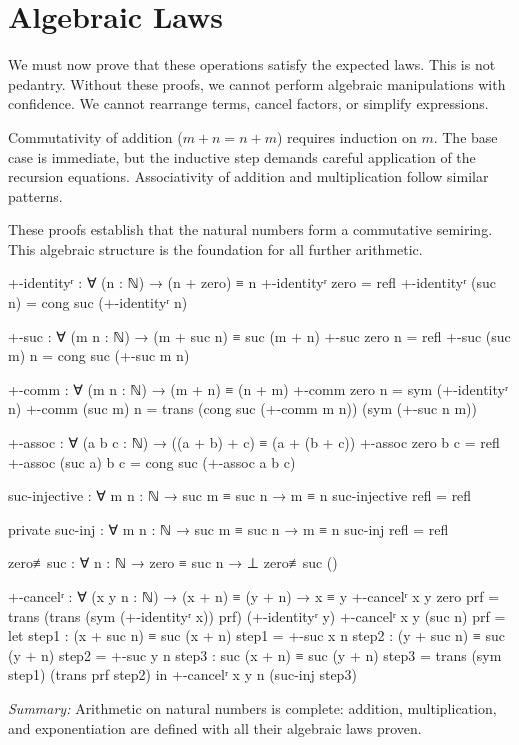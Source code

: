 \documentclass[11pt,a4paper]{book}
\begin{document}
\section{Algebraic Laws}

We must now prove that these operations satisfy the expected laws. This is not pedantry. 
Without these proofs, we cannot perform algebraic manipulations with confidence. We 
cannot rearrange terms, cancel factors, or simplify expressions.

Commutativity of addition ($m + n = n + m$) requires induction on $m$. The base case 
is immediate, but the inductive step demands careful application of the recursion 
equations. Associativity of addition and multiplication follow similar patterns.

These proofs establish that the natural numbers form a commutative semiring. This 
algebraic structure is the foundation for all further arithmetic.

\begin{code}
+-identityʳ : ∀ (n : ℕ) → (n + zero) ≡ n
+-identityʳ zero    = refl
+-identityʳ (suc n) = cong suc (+-identityʳ n)

+-suc : ∀ (m n : ℕ) → (m + suc n) ≡ suc (m + n)
+-suc zero    n = refl
+-suc (suc m) n = cong suc (+-suc m n)

+-comm : ∀ (m n : ℕ) → (m + n) ≡ (n + m)
+-comm zero    n = sym (+-identityʳ n)
+-comm (suc m) n = trans (cong suc (+-comm m n)) (sym (+-suc n m))

+-assoc : ∀ (a b c : ℕ) → ((a + b) + c) ≡ (a + (b + c))
+-assoc zero    b c = refl
+-assoc (suc a) b c = cong suc (+-assoc a b c)

suc-injective : ∀ {m n : ℕ} → suc m ≡ suc n → m ≡ n
suc-injective refl = refl

private
  suc-inj : ∀ {m n : ℕ} → suc m ≡ suc n → m ≡ n
  suc-inj refl = refl

zero≢suc : ∀ {n : ℕ} → zero ≡ suc n → ⊥
zero≢suc ()

+-cancelʳ : ∀ (x y n : ℕ) → (x + n) ≡ (y + n) → x ≡ y
+-cancelʳ x y zero prf = 
  trans (trans (sym (+-identityʳ x)) prf) (+-identityʳ y)
+-cancelʳ x y (suc n) prf = 
  let step1 : (x + suc n) ≡ suc (x + n)
      step1 = +-suc x n
      step2 : (y + suc n) ≡ suc (y + n)
      step2 = +-suc y n
      step3 : suc (x + n) ≡ suc (y + n)
      step3 = trans (sym step1) (trans prf step2)
  in +-cancelʳ x y n (suc-inj step3)

\end{code}

\medskip
\noindent\textit{Summary:} Arithmetic on natural numbers is complete: addition, multiplication, 
and exponentiation are defined with all their algebraic laws proven.
\end{document}
